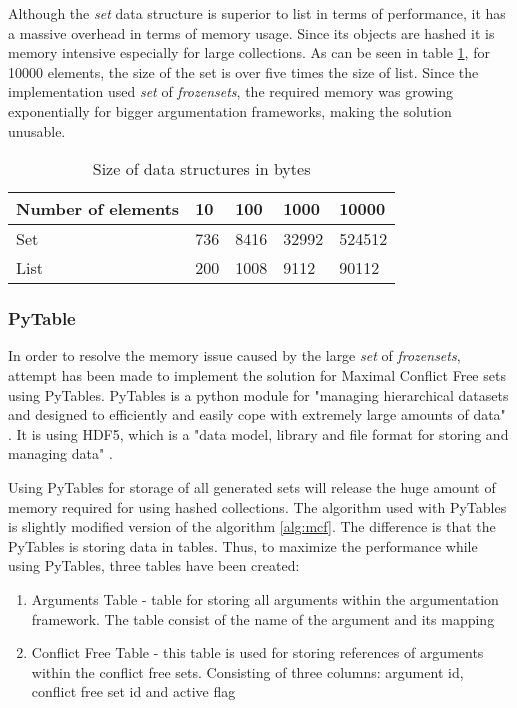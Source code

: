 Although the \textit{set} data structure is superior to list in terms of performance, it has a massive overhead in terms of memory usage. Since its objects are hashed it is memory intensive especially for large collections. As can be seen in table \ref{table:sizeDataStructures}, for 10000 elements, the size of the set is over five times the size of list. Since the implementation used \textit{set} of \textit{frozensets}, the required memory was growing exponentially for bigger argumentation frameworks, making the solution unusable.

\begin{table}[h]	
	\centering
	\caption{Size of data structures in bytes}
	\label{table:sizeDataStructures}
	\begin{tabular}{lllll}
		\hline
		Number of elements & 10  & 100  & 1000  & 10000  \\ \hline
		Set                & 736 & 8416 & 32992 & 524512 \\
		List               & 200 & 1008 & 9112  & 90112 
	\end{tabular}
\end{table}


\subsubsection{PyTable}
In order to resolve the memory issue caused by the large \textit{set} of \textit{frozensets}, attempt has been made to implement the solution for Maximal Conflict Free sets using PyTables. PyTables is a python module for "managing hierarchical datasets and designed to efficiently and easily cope with extremely large amounts of data" \citep{pytables}. It is using HDF5, which is a "data model, library and file format for storing and managing data" \citep{hdf5}. 

Using PyTables for storage of all generated sets will release the huge amount of memory required for using hashed collections. The algorithm used with PyTables is slightly modified version of the algorithm \ref{alg:mcf}. The difference is that the PyTables is storing data in tables. Thus, to maximize the performance while using PyTables, three tables have been created:
\begin{enumerate}
	\item{Arguments Table - table for storing all arguments within the argumentation framework. The table consist of the name of the argument and its mapping}
	\item{Conflict Free Table - this table is used for storing references of arguments within the conflict free sets. Consisting of three columns: argument id, conflict free set id and active flag}
\end{enumerate}

